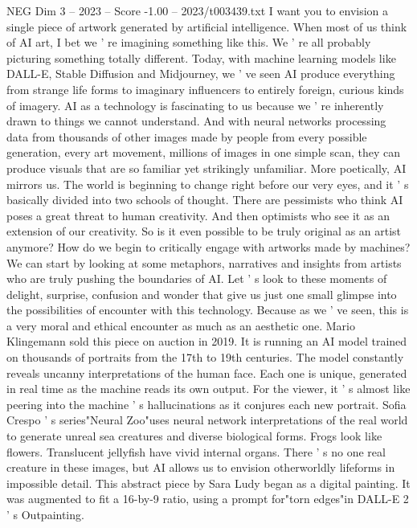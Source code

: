 \begin{textsample}{NEG Dim 3 – 2023 – Score -1.00 – 2023/t003439.txt}  \label{ex:f3_neg_044}
I want you to envision a single piece of artwork generated by artificial intelligence.
When most of us think of AI art, I bet we ' re imagining something like this.
We ' re all probably picturing something totally different.
Today, with machine learning models like DALL-E, Stable Diffusion and Midjourney, we ' ve seen AI produce everything from strange life forms to imaginary influencers to entirely foreign, curious kinds of imagery.
AI as a technology is fascinating to us because we ' re inherently drawn to things we cannot understand.
And with neural networks processing data from thousands of other images made by people from every possible generation, every art movement, millions of images in one simple scan, they can produce visuals that are so familiar yet strikingly unfamiliar.
More poetically, AI mirrors us.
The world is beginning to change right before our very eyes, and it ' s basically divided into two schools of thought.
There are pessimists who think AI poses a great threat to human creativity.
And then optimists who see it as an extension of our creativity.
So is it even possible to be truly original as an artist anymore?
How do we begin to critically engage with artworks made by machines?
We can start by looking at some metaphors, narratives and insights from artists who are truly pushing the boundaries of AI.
Let ' s look to these moments of delight, surprise, confusion and wonder that give us just one small glimpse into the possibilities of encounter with this technology.
Because as we ' ve seen, this is a very moral and ethical encounter as much as an aesthetic one.
Mario Klingemann sold this piece on auction in 2019.
It is running an AI model trained on thousands of portraits from the 17th to 19th centuries.
The model constantly reveals uncanny interpretations of the human face.
Each one is unique, generated in real time as the machine reads its own output.
For the viewer, it ' s almost like peering into the machine ' s hallucinations as it conjures each new portrait.
Sofia Crespo ' s series"Neural Zoo"uses neural network interpretations of the real world to generate unreal sea creatures and diverse biological forms.
Frogs look like flowers.
Translucent jellyfish have vivid internal organs.
There ' s no one real creature in these images, but AI allows us to envision otherworldly lifeforms in impossible detail.
This abstract piece by Sara Ludy began as a digital painting.
It was augmented to fit a 16-by-9 ratio, using a prompt for"torn edges"in DALL-E 2 ' s Outpainting.

\end{textsample}
